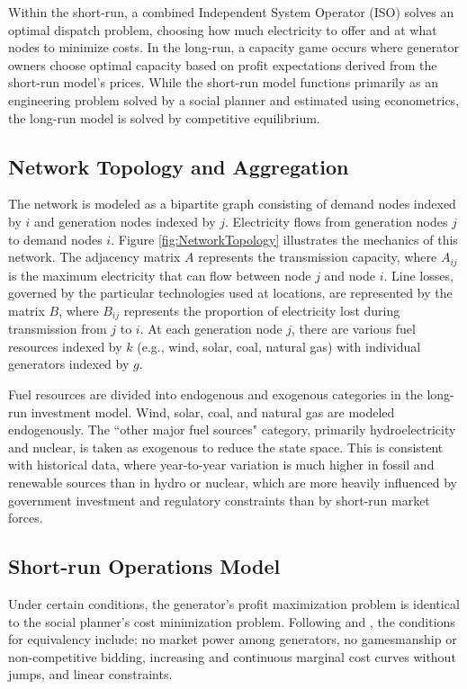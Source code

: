\documentclass[12pt]{article}
\begin{document}
Within the short-run, a combined Independent System Operator (ISO) solves an optimal dispatch problem, choosing how much electricity to offer and at what nodes to minimize costs. In the long-run, a capacity game occurs where generator owners choose optimal capacity based on profit expectations derived from the short-run model's prices. While the short-run model functions primarily as an engineering problem solved by a social planner and estimated using econometrics, the long-run model is solved by competitive equilibrium.

\subsection{Network Topology and Aggregation}

The network is modeled as a bipartite graph consisting of demand nodes indexed by $i$ and generation nodes indexed by $j$. Electricity flows from generation nodes $j$ to demand nodes $i$. Figure \ref{fig:NetworkTopology} illustrates the mechanics of this network. The adjacency matrix $A$ represents the transmission capacity, where $A_{ij}$ is the maximum electricity that can flow between node $j$ and node $i$. Line losses, governed by the particular technologies used at locations, are represented by the matrix $B$, where $B_{ij}$ represents the proportion of electricity lost during transmission from $j$ to $i$. At each generation node $j$, there are various fuel resources indexed by $k$ (e.g., wind, solar, coal, natural gas) with individual generators indexed by $g$.

Fuel resources are divided into endogenous and exogenous categories in the long-run investment model. Wind, solar, coal, and natural gas are modeled endogenously. The ``other major fuel sources" category, primarily hydroelectricity and nuclear, is taken as exogenous to reduce the state space. This is consistent with historical data, where year-to-year variation is much higher in fossil and renewable sources than in hydro or nuclear, which are more heavily influenced by government investment and regulatory constraints than by short-run market forces.

\subsection{Short-run Operations Model}

Under certain conditions, the generator's profit maximization problem is identical to the social planner's cost minimization problem. Following \cite{gilbert2004allocating} and \cite{cramton2017electricity}, the conditions for equivalency include: no market power among generators, no gamesmanship or non-competitive bidding, increasing and continuous marginal cost curves without jumps, and linear constraints.
\end{document}
